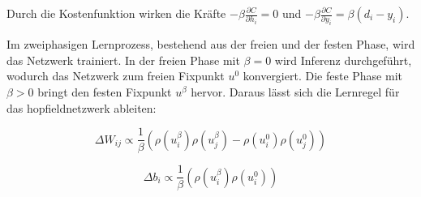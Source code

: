 Durch die Kostenfunktion wirken die Kräfte \(-\beta\frac{\partial C}{\partial h_i}=0\) und \(-\beta\frac{\partial C}{\partial y_i}=\beta(d_i-y_i)\).

Im zweiphasigen Lernprozess, bestehend aus der freien und der festen Phase, wird das Netzwerk trainiert. In der freien Phase mit \(\beta=0\) wird Inferenz durchgeführt, wodurch das Netzwerk zum freien Fixpunkt \(u^0\) konvergiert. Die feste Phase mit \(\beta>0\) bringt den festen Fixpunkt \(u^\beta\) hervor. Daraus lässt sich die Lernregel für das \gls{hopfieldnetzwerk} ableiten:

\[\Delta W_{ij}\propto\frac{1}{\beta}\left(\rho(u_i^\beta)\rho(u_j^\beta)-\rho(u_i^0)\rho(u_j^0)\right)\]

\[\Delta b_i\propto\frac{1}{\beta}\left(\rho(u_i^\beta)\rho(u_i^0)\right)\]
